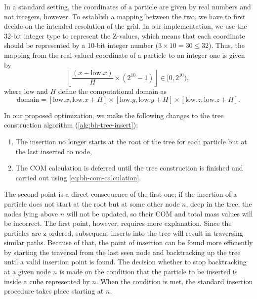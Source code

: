 In a standard setting, the coordinates of a particle are given by real numbers and not integers, however.
To establish a mapping between the two, we have to first decide on the intended resolution of the grid.
In our implementation, we use the 32-bit integer type to represent the Z-values, which means that each coordinate should be represented by a 10-bit integer number ($3 \times 10 = 30 \leq 32$).
Thus, the mapping from the real-valued coordinate of a particle to an integer one is given by
\begin{equation*}
    \left\lfloor \frac{(x - \text{low}.x)}{H} \times (2^{10} - 1)\right\rfloor \in [0, 2^{10}),
\end{equation*}
where $\text{low}$ and $H$ define the computational domain as
\begin{equation*}
    \text{domain} = [\text{low}.x, \text{low}.x + H] \times [\text{low}.y, \text{low}.y + H] \times [\text{low}.z, \text{low}.z + H].
\end{equation*}

In our proposed optimization, we make the following changes to the tree construction algorithm (\autoref{alg:bh-tree-insert}):
\begin{enumerate}
    \item The insertion no longer starts at the root of the tree for each particle but at the last inserted to node,
    \item The COM calculation is deferred until the tree construction is finished and carried out using \autoref{eq:bh-com-calculation}.
\end{enumerate}
The second point is a direct consequence of the first one;
if the insertion of a particle does not start at the root but at some other node $n$, deep in the tree, the nodes lying above $n$ will not be updated, so their COM and total mass values will be incorrect.
The first point, however, requires more explanation.
Since the particles are z-ordered, subsequent inserts into the tree will result in traversing similar paths.
Because of that, the point of insertion can be found more efficiently by starting the traversal from the last seen node and backtracking up the tree until a valid insertion point is found.
The decision whether to stop backtracking at a given node $n$ is made on the condition that the particle to be inserted is inside a cube represented by $n$.
When the condition is met, the standard insertion procedure takes place starting at $n$.

